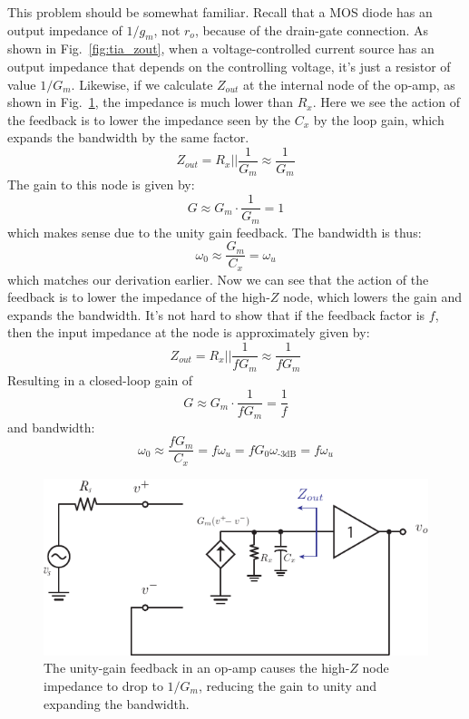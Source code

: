 This problem should be somewhat familiar.  Recall that a MOS diode has an output impedance of $1/g_m$, not $r_o$, because of the drain-gate connection.  As shown in Fig.~\ref{fig:tia_zout}, when a voltage-controlled current source has an output impedance that depends on the controlling voltage, it's just a resistor of value $1/G_m$.  Likewise, if we calculate $Z_{out}$ at the internal node of the op-amp, as shown in Fig.~\ref{fig:opamp_model_fb_unity_label}, the impedance is much lower than $R_x$.   Here we see the action of the feedback is to lower the impedance seen by the $C_x$ by the loop gain, which expands the bandwidth by the same factor.
%
\begin{equation}
	Z_{out} = R_x || \frac{1}{G_m} \approx \frac{1}{G_m}
\end{equation}
%
The gain to this node is given by:
%
\begin{equation}
	G \approx G_m \cdot \frac{1}{G_m} = 1
\end{equation}
%
which makes sense due to the unity gain feedback.  The bandwidth is thus:
%
\begin{equation}
	\omega_0 \approx \frac{G_m}{C_x } = \omega_u
\end{equation}
%
which matches our derivation earlier.  Now we can see that the action of the feedback is to lower the impedance of the high-$Z$ node, which lowers the gain and expands the bandwidth. It's not hard to show that if the feedback factor is $f$, then the input impedance at the node is approximately given by:
%  
\begin{equation}
	Z_{out} = R_x || \frac{1}{f G_m} \approx \frac{1}{f G_m}
\end{equation}
%
Resulting in a closed-loop gain of 
\begin{equation}
	G \approx G_m \cdot \frac{1}{f G_m} = \frac{1}{f}
\end{equation}
%
and bandwidth:
%
\begin{equation}
	\omega_0 \approx \frac{f G_m}{C_x } = f \omega_u  = f G_0 \omega_{\text{-3dB}} = f \omega_u  
\end{equation}
 
\begin{figure}[tb]
\begin{center}
\includegraphics[scale=1]{opamp_model_fb_unity_label}
\end{center}
\caption{The unity-gain feedback in an op-amp causes the high-$Z$ node impedance to drop to $1/G_m$, reducing the gain to unity and expanding the bandwidth.} \label{fig:opamp_model_fb_unity_label}
\end{figure}
 



